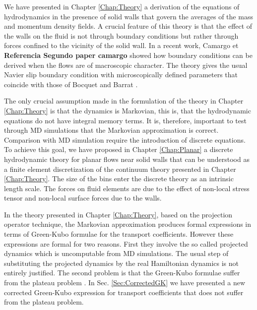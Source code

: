 \documentclass[a4paper,openright,12pt]{book}
\newcommand{\Note}[1]{{\bf \color{red}#1}}    %
\begin{document}
We  have presented  in  Chapter \ref{Chap:Theory}  a  derivation of  the
equations of hydrodynamics in the  presence of solid walls that govern
the  averages of  the  mass  and momentum  density  fields. A  crucial
feature of this theory is that the effect of the walls on the fluid is
not through boundary conditions but  rather through forces confined to
the vicinity  of the solid wall.  In a recent work, Camargo et \Note{Referencia Segundo paper camargo} showed  how  boundary  conditions  can  be  derived  when  the  flows  are  of
macroscopic  character.  The  theory  gives  the usual  Navier  slip
boundary  condition  with   microscopically  defined  parameters  that
coincide      with      those      of     Bocquet      and      Barrat
\cite{Bocquet1994}.  

The only crucial  assumption made in the formulation of  the theory in
Chapter \ref{Chap:Theory} is  that the dynamics  is Markovian, this  is, that
the hydrodynamic equations do not  have integral memory terms.  It is,
therefore, important to test through MD simulations that the Markovian
approximation is  correct.  Comparison with MD  simulation require the
introduction  of discrete  equations. To  achieve this  goal, we  have
proposed in Chapter \ref{Chap:Planar} a  discrete hydrodynamic theory  for planar
flows near  solid walls  that can  be understood  as a  finite element
discretization of  the continuum  theory presented in Chapter \ref{Chap:Theory}.
The size of the bins enter  the discrete theory as an intrinsic length
scale. The forces on fluid elements are due to the effect of non-local
stress tensor and non-local surface forces due to the walls.

In the  theory presented in Chapter \ref{Chap:Theory}, based  on the
projection  operator technique,  the Markovian  approximation produces
formal expressions in  terms of Green-Kubo formulae  for the transport
coefficients.    However  these   expressions  are   formal  for   two
reasons. First they involve the  so called projected dynamics which is
uncomputable from MD  simulations. The usual step  of substituting the
projected dynamics  by the real  Hamiltonian dynamics is  not entirely
justified. The second  problem is that the  Green-Kubo formulae suffer
from the plateau problem \cite{Kirkwood1949,Espanol1992}.  
In Sec. \ref{Sec:CorrectedGK} we have  presented a   new  corrected   Green-Kubo  expression   for  transport
coefficients that does not suffer from the plateau problem.
\end{document}
